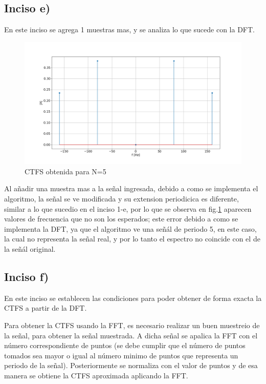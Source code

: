 \documentclass[letterpaper]{article}
\begin{document}
    \subsection*{Inciso e)}

    En este inciso se agrega 1 muestras mas, y se analiza lo que sucede con la DFT.

    \begin{figure}[H]
        \centering
        \includegraphics[width=\textwidth]{Img/punto_2_e.png}
        \caption{CTFS obtenida para N=5}
        \label{fig.2e}
    \end{figure}

    Al añadir una muestra mas a la señal ingresada, debido a como se implementa el algoritmo, la señal se ve modificada y su 
    extension periodicica es diferente, similar a lo que sucedio en el inciso 1-e, por lo que se observa en fig.\ref{fig.2e} aparecen 
    valores de frecuencia que no son los esperados;
    este error debido a como se implementa la DFT, ya que el algoritmo ve una señál de periodo 5, en este caso, la cual no 
    representa la señal real, y por lo tanto el espectro no coincide con el de la señál original.


    \subsection*{Inciso f)}

    En este inciso se establecen las condiciones para poder obtener de forma exacta la 
    CTFS a partir de la DFT.

    Para obtener la CTFS usando la FFT, es necesario realizar un buen muestreio de la señal, 
    para obtener la señal muestrada. A dicha señal se apalica la FFT con el número correspondiente
    de puntos (se debe cumplir que el número de puntos tomados sea mayor o igual al número minimo de puntos que representa un periodo de la señal). 
    Posteriormente se normaliza con el valor de puntos 
    y de esa manera se obtiene la CTFS aproximada aplicando la FFT.
\end{document}
